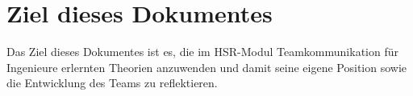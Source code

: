 
\chapter{Ziel dieses Dokumentes}

Das Ziel dieses Dokumentes ist es, die im HSR-Modul Teamkommunikation für Ingenieure erlernten Theorien anzuwenden und damit seine eigene Position sowie die Entwicklung des Teams zu reflektieren.
